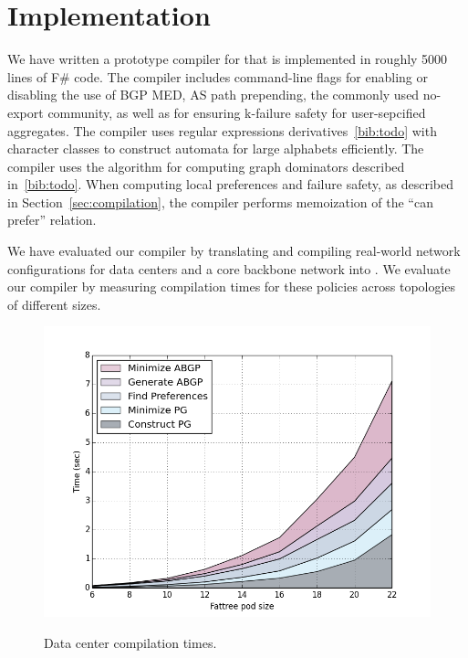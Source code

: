\section{Implementation}

We have written a prototype compiler for \sysname that is implemented in roughly 5000 lines of F\# code. The compiler includes command-line flags for enabling or disabling the use of BGP MED, AS path prepending, the commonly used no-export community, as well as for ensuring k-failure safety for user-sepcified aggregates. The compiler uses regular expressions derivatives~\ref{bib:todo} with character classes to construct automata for large alphabets efficiently. The compiler uses the algorithm for computing graph dominators described in~\ref{bib:todo}. When computing local preferences and failure safety, as described in Section~\ref{sec:compilation}, the compiler performs memoization of the ``can prefer'' relation. 

We have evaluated our compiler by translating and compiling real-world network configurations for data centers and a core backbone network into \sysname. We evaluate our compiler by measuring compilation times for these policies across topologies of different sizes.

\begin{figure}[t!]
\centering
\includegraphics[width=\columnwidth]{figures/compilation-times-dc.png}
\label{fig:compilation-times-dc}
\caption{Data center compilation times.}
\end{figure}

